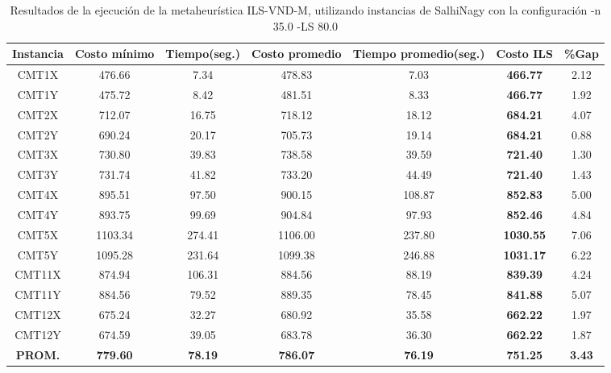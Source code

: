 \begin{table}[h]
\caption{Resultados de la ejecución de la metaheurística ILS-VND-M, utilizando instancias de SalhiNagy con la configuración -n 35.0 -LS 80.0}
\centering
\small
\begin{tabular}{c c c c c c c}
\hline\hline
Instancia & Costo mínimo & Tiempo(seg.) & Costo promedio & Tiempo promedio(seg.) & Costo ILS & \%Gap \\ [0.5ex]
\hline
CMT1X & 476.66 & 7.34 & 
478.83 & 7.03 & \bf{466.77} & 
2.12\\CMT1Y & 475.72 & 8.42 & 
481.51 & 8.33 & \bf{466.77} & 
1.92\\CMT2X & 712.07 & 16.75 & 
718.12 & 18.12 & \bf{684.21} & 
4.07\\CMT2Y & 690.24 & 20.17 & 
705.73 & 19.14 & \bf{684.21} & 
0.88\\CMT3X & 730.80 & 39.83 & 
738.58 & 39.59 & \bf{721.40} & 
1.30\\CMT3Y & 731.74 & 41.82 & 
733.20 & 44.49 & \bf{721.40} & 
1.43\\CMT4X & 895.51 & 97.50 & 
900.15 & 108.87 & \bf{852.83} & 
5.00\\CMT4Y & 893.75 & 99.69 & 
904.84 & 97.93 & \bf{852.46} & 
4.84\\CMT5X & 1103.34 & 274.41 & 
1106.00 & 237.80 & \bf{1030.55} & 
7.06\\CMT5Y & 1095.28 & 231.64 & 
1099.38 & 246.88 & \bf{1031.17} & 
6.22\\CMT11X & 874.94 & 106.31 & 
884.56 & 88.19 & \bf{839.39} & 
4.24\\CMT11Y & 884.56 & 79.52 & 
889.35 & 78.45 & \bf{841.88} & 
5.07\\CMT12X & 675.24 & 32.27 & 
680.92 & 35.58 & \bf{662.22} & 
1.97\\CMT12Y & 674.59 & 39.05 & 
683.78 & 36.30 & \bf{662.22} & 
1.87\\\bf{PROM.} & 
\bf{779.60} & \bf{78.19} & \bf{786.07} & \bf{76.19} & \bf{751.25} & \bf{3.43}\\[1ex]\hline
\end{tabular}
\label{table:ILS-VND-M-35-80-S}
\end{table}

